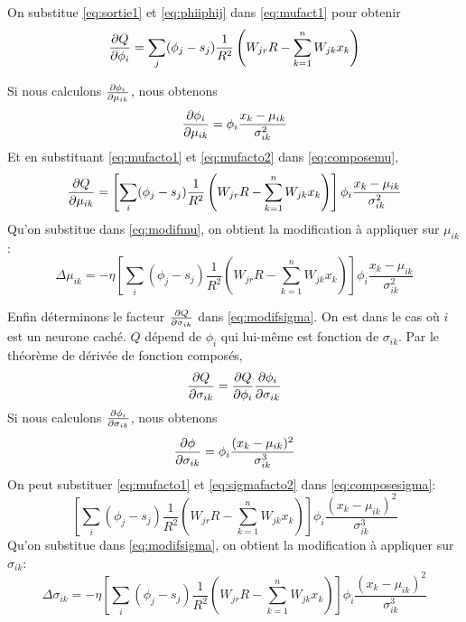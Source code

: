 On substitue \eqref{eq:sortie1} et \eqref{eq:phiiphij} dans \eqref{eq:mufact1} pour obtenir
\begin{equation}\label{eq:mufacto1}
 \frac{\partial Q}{\partial \phi_i} = \sum_{j} (\phi_j - s_j) \frac{1}{R^2} \left(W_{jr}R - \sum_{k=1}^{n}W_{jk}x_k\right)
\end{equation}

Si nous calculons $\frac{\partial \phi_i}{\partial \mu_{ik}}$, nous obtenons
\begin{equation}\label{eq:mufacto2}
 \frac{\partial \phi_i}{\partial \mu_{ik}} = \phi_i \frac{x_k-\mu_{ik}}{\sigma_{ik}^2}
\end{equation}
Et en substituant \eqref{eq:mufacto1} et \eqref{eq:mufacto2} dans \eqref{eq:composemu},
\[\frac{\partial Q}{\partial \mu_{ik}} = \left[\sum_{i}(\phi_j - s_j) \frac{1}{R^2} \left(W_{jr}R - \sum_{k=1}^{n}W_{jk}x_k\right)\right] \phi_i\frac{x_k-\mu_{ik}}{\sigma_{ik}^2}\]
Qu'on substitue dans \eqref{eq:modifmu}, on obtient la modification à appliquer sur $\mu_{ik}$:
\[\Delta\mu_{ik} = -\eta \left[\sum_{i}(\phi_j - s_j) \frac{1}{R^2} \left(W_{jr}R - \sum_{k=1}^{n}W_{jk}x_k\right)\right] \phi_i\frac{x_k-\mu_{ik}}{\sigma_{ik}^2}\]

Enfin déterminons le facteur $\frac{\partial Q}{\partial \sigma_{ik}}$ dans \eqref{eq:modifsigma}. On est dans le cas où $i$ est un neurone caché.
$Q$ dépend de $\phi_i$ qui lui-même est fonction de $\sigma_{ik}$. Par le théorème de dérivée de fonction composés,
\begin{equation}\label{eq:composesigma}
 \frac{\partial Q}{\partial \sigma_{ik}} = \frac{\partial Q}{\partial \phi_i} \frac{\partial \phi_i}{\partial \sigma_{ik}}
\end{equation}
Si nous calculons $\frac{\partial \phi_i}{\partial \sigma_{ik}}$, nous obtenons
\begin{equation}\label{eq:sigmafacto2}
 \frac{\partial \phi}{\partial \sigma_{ik}} = \phi_i \frac{(x_k-\mu_{ik})^2}{\sigma_{ik}^3}
\end{equation}
On peut substituer \eqref{eq:mufacto1} et \eqref{eq:sigmafacto2} dans \eqref{eq:composesigma}:
\[\left[\sum_{i}(\phi_j - s_j) \frac{1}{R^2} \left(W_{jr}R - \sum_{k=1}^{n}W_{jk}x_k\right)\right] \phi_i \frac{(x_k-\mu_{ik})^2}{\sigma_{ik}^3}\]
Qu'on substitue dans \eqref{eq:modifsigma}, on obtient la modification à appliquer sur $\sigma_{ik}$:
\[\Delta \sigma_{ik} = -\eta \left[\sum_{i}(\phi_j - s_j) \frac{1}{R^2} \left(W_{jr}R - \sum_{k=1}^{n}W_{jk}x_k\right)\right] \phi_i \frac{(x_k-\mu_{ik})^2}{\sigma_{ik}^3}\]